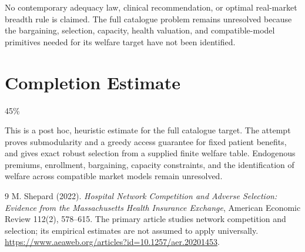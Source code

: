 \documentclass[11pt,a4paper]{article}
\begin{document}
No contemporary adequacy law, clinical recommendation, or optimal real-market breadth rule is claimed. The full catalogue problem remains unresolved because the bargaining, selection, capacity, health valuation, and compatible-model primitives needed for its welfare target have not been identified.

\section{Completion Estimate}
45\%

This is a post hoc, heuristic estimate for the full catalogue target.
The attempt proves submodularity and a greedy access guarantee for fixed patient benefits, and gives exact robust selection from a supplied finite welfare table. Endogenous premiums, enrollment, bargaining, capacity constraints, and the identification of welfare across compatible market models remain unresolved.

\begin{thebibliography}{9}
 M. Shepard (2022).
\emph{Hospital Network Competition and Adverse Selection: Evidence from the Massachusetts Health Insurance Exchange}, American Economic Review 112(2), 578--615.
The primary article studies network competition and selection; its empirical estimates are not assumed to apply universally.
\url{https://www.aeaweb.org/articles?id=10.1257/aer.20201453}.
\end{thebibliography}
\end{document}
